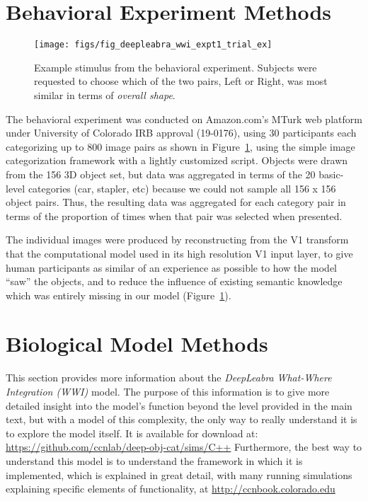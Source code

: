 \documentclass[12pt,twoside]{article}
\newif\myifpdf
\begin{document}
\section{Behavioral Experiment Methods}

\begin{figure}
  \centering\texttt{[image: figs/fig\_deepleabra\_wwi\_expt1\_trial\_ex]}
  \caption{Example stimulus from the behavioral experiment.  Subjects were requested to choose which of the two pairs, Left or Right, was most similar in terms of {\em overall shape}.}
  \label{fig.expt}
\end{figure}

The behavioral experiment was conducted on Amazon.com's MTurk web platform under University of Colorado IRB approval (19-0176), using 30 participants each categorizing up to 800 image pairs as shown in Figure~\ref{fig.expt}, using the simple image categorization framework with a lightly customized script.  Objects were drawn from the 156 3D object set, but data was aggregated in terms of the 20 basic-level categories (car, stapler, etc) because we could not sample all 156 x 156 object pairs.  Thus, the resulting data was aggregated for each category pair in terms of the proportion of times when that pair was selected when presented.

The individual images were produced by reconstructing from the V1 transform that the computational model used in its high resolution V1 input layer, to give human participants as similar of an experience as possible to how the model ``saw'' the objects, and to reduce the influence of existing semantic knowledge which was entirely missing in our model (Figure~\ref{fig.expt}).

\section{Biological Model Methods}

This section provides more information about the {\em DeepLeabra} {\em What-Where Integration (WWI)} model.  The purpose of this information is to give more detailed insight into the model's function beyond the level provided in the main text, but with a model of this complexity, the only way to really understand it is to explore the model itself.  It is available for download at: \url{https://github.com/ccnlab/deep-obj-cat/sims/C++}  Furthermore, the best way to understand this model is to understand the framework in which it is implemented, which is explained in great detail, with many running simulations explaining specific elements of functionality, at \url{http://ccnbook.colorado.edu}
\end{document}
